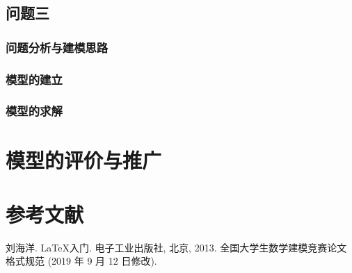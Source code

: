 \documentclass[withoutpreface,bwprint]{cumcmthesis} %
\begin{document}
\subsection{问题三}
	\subsubsection{问题分析与建模思路}


	\subsubsection{模型的建立}


	\subsubsection{模型的求解}

\section{模型的评价与推广}


\section{参考文献}

\begin{thebibliography}{9}%
    刘海洋.
    \newblock \LaTeX {}入门\allowbreak[J].
    \newblock 电子工业出版社, 北京, 2013.
    全国大学生数学建模竞赛论文格式规范 (2019 年 9 月 12 日修改).
\end{thebibliography}
\end{document}
